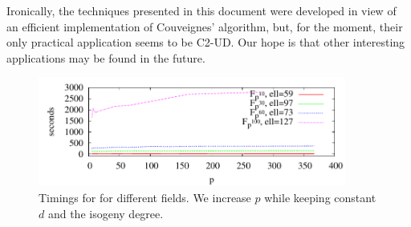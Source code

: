   Ironically, the
techniques presented in this document were developed in view of an
efficient implementation of Couveignes' algorithm, but, for the
moment, their only practical application seems to be C2-UD. Our hope
is that other interesting applications may be found in the future.

\begin{figure}
  \centering
  \includegraphics[width=0.9\textwidth]{isogeny/LSp}
  \caption{Timings for \hyperref[alg:le-si]{} for
    different fields. We increase $p$ while keeping constant $d$ and
    the isogeny degree.}
  \label{fig:LSp}
\end{figure}


%
